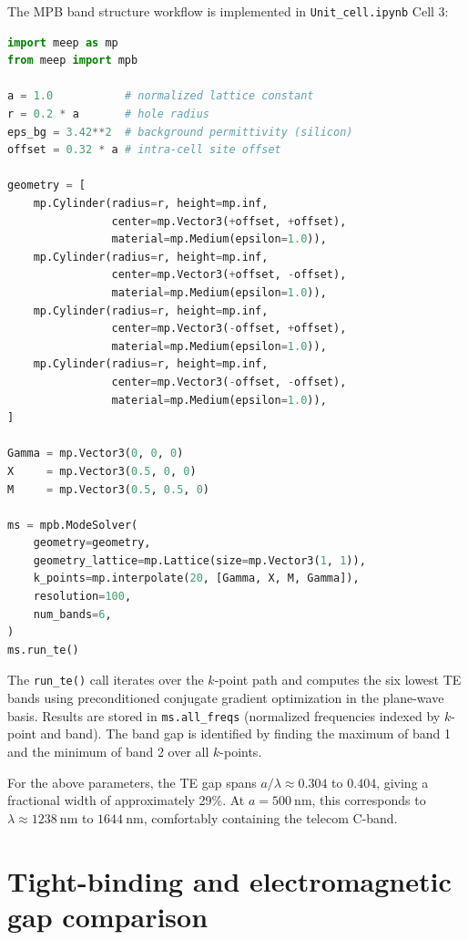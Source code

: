 \documentclass[12pt,a4paper,oneside]{book}
\theoremstyle{plain}
\theoremstyle{definition}
\theoremstyle{remark}
\begin{document}
The MPB band structure workflow is implemented in \texttt{Unit\_cell.ipynb} Cell 3:

\begin{lstlisting}[language=Python, caption={MPB setup for the square-lattice four-site photonic crystal (from \texttt{Unit\_cell.ipynb}).}]
import meep as mp
from meep import mpb

a = 1.0           # normalized lattice constant
r = 0.2 * a       # hole radius
eps_bg = 3.42**2  # background permittivity (silicon)
offset = 0.32 * a # intra-cell site offset

geometry = [
    mp.Cylinder(radius=r, height=mp.inf,
                center=mp.Vector3(+offset, +offset),
                material=mp.Medium(epsilon=1.0)),
    mp.Cylinder(radius=r, height=mp.inf,
                center=mp.Vector3(+offset, -offset),
                material=mp.Medium(epsilon=1.0)),
    mp.Cylinder(radius=r, height=mp.inf,
                center=mp.Vector3(-offset, +offset),
                material=mp.Medium(epsilon=1.0)),
    mp.Cylinder(radius=r, height=mp.inf,
                center=mp.Vector3(-offset, -offset),
                material=mp.Medium(epsilon=1.0)),
]

Gamma = mp.Vector3(0, 0, 0)
X     = mp.Vector3(0.5, 0, 0)
M     = mp.Vector3(0.5, 0.5, 0)

ms = mpb.ModeSolver(
    geometry=geometry,
    geometry_lattice=mp.Lattice(size=mp.Vector3(1, 1)),
    k_points=mp.interpolate(20, [Gamma, X, M, Gamma]),
    resolution=100,
    num_bands=6,
)
ms.run_te()
\end{lstlisting}

The \texttt{run\_te()} call iterates over the $k$-point path and computes the six lowest TE bands using preconditioned conjugate gradient optimization in the plane-wave basis. Results are stored in \texttt{ms.all\_freqs} (normalized frequencies indexed by $k$-point and band). The band gap is identified by finding the maximum of band 1 and the minimum of band 2 over all $k$-points.

For the above parameters, the TE gap spans $a/\lambda \approx 0.304$ to $0.404$, giving a fractional width of approximately 29\%. At $a = \SI{500}{\nano\metre}$, this corresponds to $\lambda \approx \SI{1238}{\nano\metre}$ to $\SI{1644}{\nano\metre}$, comfortably containing the telecom C-band.

\section{Tight-binding and electromagnetic gap comparison}
\label{sec:tb-gap-comparison}
\end{document}
